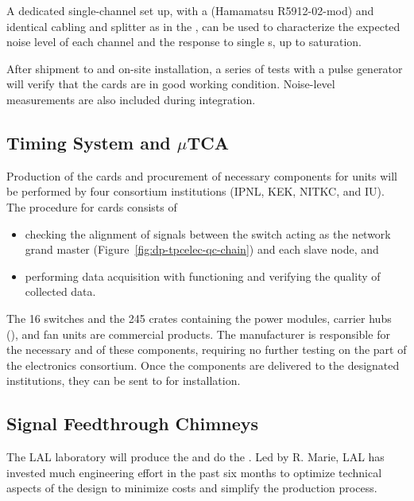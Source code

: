A dedicated single-channel set up, with a  (Hamamatsu R5912-02-mod) and identical cabling and splitter as in the , can be used to characterize the expected noise level of each channel and the response to single \phel{}s, up to saturation. 

After shipment to  and on-site installation, a series of tests with a pulse generator will verify that the cards are in good working condition. Noise-level measurements are also included during integration.


\subsection{Timing System and $\mu$TCA}
\label{ssec:dp-tpcelec-prod-utca}

Production of the cards and procurement of necessary  components for  units will be performed by four consortium institutions (IPNL, KEK, NITKC, and IU). The  procedure for  cards consists of 
\begin{itemize}
\item{checking the alignment of  signals between the  switch acting as the network grand master (Figure~\ref{fig:dp-tpcelec-qc-chain}) and each  slave node, and }
\item{performing data acquisition with functioning  and verifying the quality of collected data.}
\end{itemize}

The  \num{16}  switches and the \num{245}  crates containing the power modules, carrier hubs (), and fan units are commercial products. The manufacturer is responsible for the necessary  and   of these components, requiring no further testing on the part of the  electronics consortium. Once the components are delivered to the designated institutions, they can be sent to  for installation. 


\subsection{Signal Feedthrough Chimneys}
\label{ssec:dp-tpcelec-prod-sft}

The LAL laboratory will produce the  and do the . Led by R. Marie, LAL has invested much engineering effort in the past six months to optimize technical aspects of the design to minimize costs and simplify the production process.

